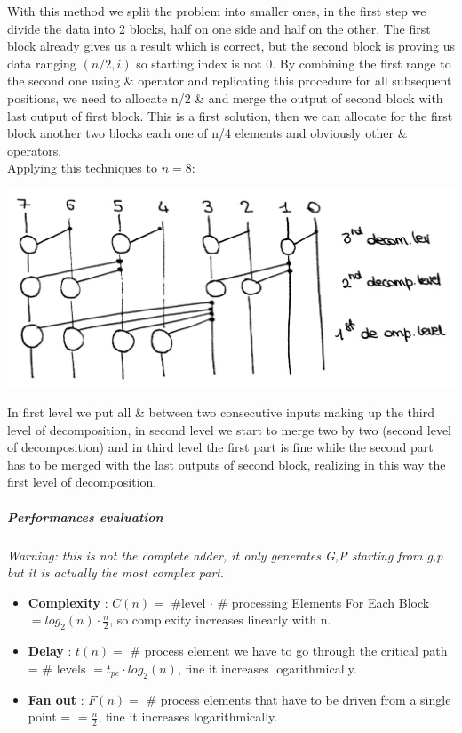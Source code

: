 With this method we split the problem into smaller ones, in the first step we divide the data into 2 blocks, half on one side and half on the other. The first block already gives us a result which is correct, but the second block is proving us data ranging $(n/2, i)$ so starting index is not 0. By combining the first range to the second one using \& operator and replicating this procedure for all subsequent positions, we need to allocate n/2 \& and merge the output of second block with last output of first block.
This is a first solution, then we can allocate for the first block another two blocks each one of n/4 elements and obviously other \& operators.\\

Applying this techniques to $n=8$:

\begin{center}
  \includegraphics[width=0.7\linewidth]{img/img2/21}
\end{center}

In first level we put all \& between two consecutive inputs making up the third level of decomposition, in second level we start to merge two by two (second level of decomposition)
and in third level the first part is fine while the second part has to be merged with the last outputs of second block, realizing in this way the first level of decomposition.

\subparagraph{Performances evaluation}
\textit{Warning: this is not the complete adder, it only generates G,P starting from g,p but it is actually the most complex part}.\\

\begin{itemize}
  \item \textbf{Complexity} : $ C(n) = $ \#level $\cdot$ \# processing Elements For Each Block $=log_2 (n) \cdot \frac{n}{2}$, so complexity increases linearly with n.
  \item \textbf{Delay} : $ t(n) = $ \# process element we have to go through the critical path = \# levels $= t_{pe} \cdot log_2(n)  $, fine it increases logarithmically.
  \item \textbf{Fan out} : $ F(n) = $ \# process elements that have to be driven from a single point = $= \frac{n}{2}   $, fine it increases logarithmically.

\end{itemize}

